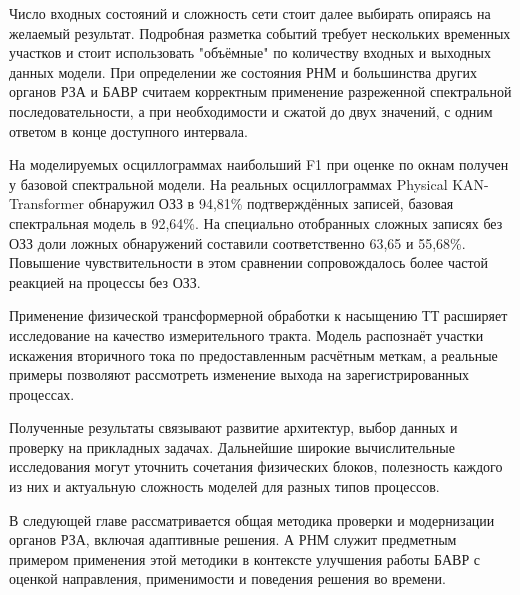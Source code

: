 Число входных состояний и сложность сети стоит далее выбирать опираясь
на желаемый результат. Подробная разметка событий требует
нескольких временных участков и стоит использовать "объёмные" по количеству входных и
выходных данных модели.
При определении же состояния РНМ и большинства других органов РЗА и БАВР
считаем корректным применение разреженной спектральной последовательности,
а при необходимости и сжатой до двух значений, с одним ответом в конце доступного интервала. 

{}
На моделируемых осциллограммах наибольший F1 при оценке по окнам получен у базовой спектральной модели. На реальных осциллограммах Physical KAN-Transformer обнаружил ОЗЗ в 94,81\% подтверждённых записей, базовая спектральная модель в 92,64\%. На специально отобранных сложных записях без ОЗЗ доли ложных обнаружений составили соответственно 63,65 и 55,68\%. Повышение чувствительности в этом сравнении сопровождалось более частой реакцией на процессы без ОЗЗ.

Применение физической трансформерной обработки
к насыщению ТТ расширяет исследование на качество
измерительного тракта. Модель распознаёт участки искажения
вторичного тока по предоставленным расчётным меткам,
а реальные примеры позволяют рассмотреть изменение выхода
на зарегистрированных процессах.

Полученные результаты связывают развитие архитектур,
выбор данных и проверку на прикладных задачах.
Дальнейшие широкие вычислительные исследования могут уточнить
сочетания физических блоков, полезность каждого из них 
и актуальную сложность моделей для разных типов процессов.

В следующей главе рассматривается
общая методика проверки и модернизации органов РЗА,
включая адаптивные решения. А РНМ служит предметным
примером применения этой методики в контексте улучшения работы БАВР
с оценкой направления, применимости и поведения решения во времени.

{}


